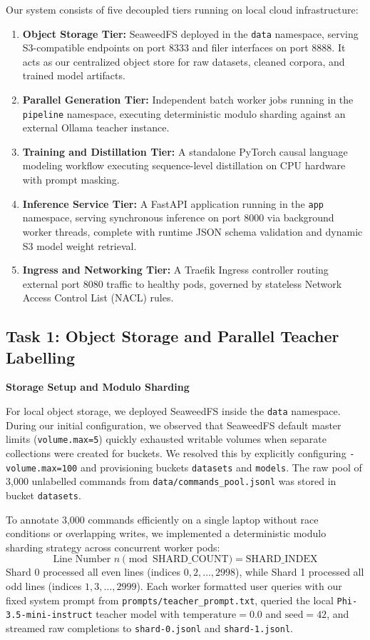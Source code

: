 \documentclass[10pt,a4paper]{article}
\begin{document}
Our system consists of five decoupled tiers running on local cloud infrastructure:
\begin{enumerate}
    \item \textbf{Object Storage Tier:} SeaweedFS deployed in the \texttt{data} namespace, serving S3-compatible endpoints on port 8333 and filer interfaces on port 8888. It acts as our centralized object store for raw datasets, cleaned corpora, and trained model artifacts.
    \item \textbf{Parallel Generation Tier:} Independent batch worker jobs running in the \texttt{pipeline} namespace, executing deterministic modulo sharding against an external Ollama teacher instance.
    \item \textbf{Training and Distillation Tier:} A standalone PyTorch causal language modeling workflow executing sequence-level distillation on CPU hardware with prompt masking.
    \item \textbf{Inference Service Tier:} A FastAPI application running in the \texttt{app} namespace, serving synchronous inference on port 8000 via background worker threads, complete with runtime JSON schema validation and dynamic S3 model weight retrieval.
    \item \textbf{Ingress and Networking Tier:} A Traefik Ingress controller routing external port 8080 traffic to healthy pods, governed by stateless Network Access Control List (NACL) rules.
\end{enumerate}

\subsection*{Task 1: Object Storage and Parallel Teacher Labelling}

\textbf{Storage Setup and Modulo Sharding}

For local object storage, we deployed SeaweedFS inside the \texttt{data} namespace. During our initial configuration, we observed that SeaweedFS default master limits (\texttt{volume.max=5}) quickly exhausted writable volumes when separate collections were created for buckets. We resolved this by explicitly configuring \texttt{-volume.max=100} and provisioning buckets \texttt{datasets} and \texttt{models}. The raw pool of 3,000 unlabelled commands from \texttt{data/commands\_pool.jsonl} was stored in bucket \texttt{datasets}.

To annotate 3,000 commands efficiently on a single laptop without race conditions or overlapping writes, we implemented a deterministic modulo sharding strategy across concurrent worker pods:
\begin{equation*}
\text{Line Number } n \pmod{\text{SHARD\_COUNT}} = \text{SHARD\_INDEX}
\end{equation*}
Shard 0 processed all even lines (indices $0, 2, \dots, 2998$), while Shard 1 processed all odd lines (indices $1, 3, \dots, 2999$). Each worker formatted user queries with our fixed system prompt from \texttt{prompts/teacher\_prompt.txt}, queried the local \texttt{Phi-3.5-mini-instruct} teacher model with $\text{temperature} = 0.0$ and $\text{seed} = 42$, and streamed raw completions to \texttt{shard-0.jsonl} and \texttt{shard-1.jsonl}.
\end{document}
